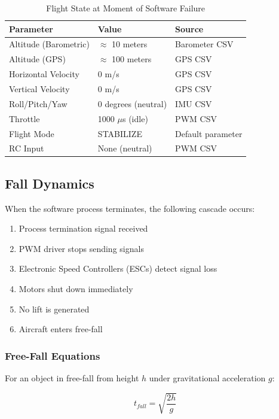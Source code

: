 \documentclass[11pt,a4paper]{article}
\begin{document}
\begin{table}[H]
\centering
\caption{Flight State at Moment of Software Failure}
\label{tab:flight_state}
\begin{tabular}{@{}lll@{}}
\toprule
\textbf{Parameter} & \textbf{Value} & \textbf{Source} \\
\midrule
Altitude (Barometric) & $\approx$ 10 meters & Barometer CSV \\
Altitude (GPS) & $\approx$ 100 meters & GPS CSV \\
Horizontal Velocity & 0 m/s & GPS CSV \\
Vertical Velocity & 0 m/s & GPS CSV \\
Roll/Pitch/Yaw & 0 degrees (neutral) & IMU CSV \\
Throttle & 1000 $\mu$s (idle) & PWM CSV \\
Flight Mode & STABILIZE & Default parameter \\
RC Input & None (neutral) & PWM CSV \\
\bottomrule
\end{tabular}
\end{table}

\subsection{Fall Dynamics}

When the software process terminates, the following cascade occurs:

\begin{enumerate}
  \item Process termination signal received
  \item PWM driver stops sending signals
  \item Electronic Speed Controllers (ESCs) detect signal loss
  \item Motors shut down immediately
  \item No lift is generated
  \item Aircraft enters free-fall
\end{enumerate}

\subsubsection{Free-Fall Equations}

For an object in free-fall from height $h$ under gravitational acceleration $g$:

\begin{equation}
t_{fall} = \sqrt{\frac{2h}{g}}
\end{equation}
\end{document}
